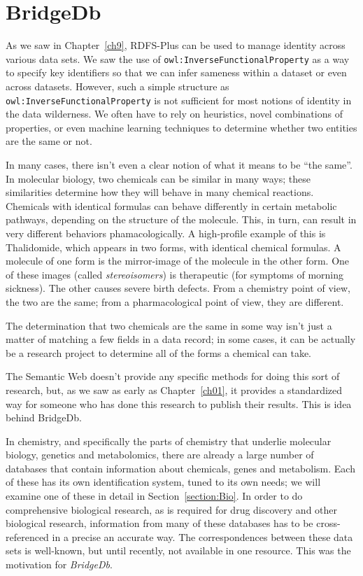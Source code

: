 \section{BridgeDb}

As we saw in Chapter~\ref{ch9}, RDFS-Plus can be used to manage identity 
across various data sets.  We saw the use of \texttt{owl:InverseFunctionalProperty}
as a way to specify key identifiers so that we can infer sameness within a 
dataset or even across datasets.  However, such a simple structure as 
\texttt{owl:InverseFunctionalProperty} is not sufficient for most notions of identity
in the data wilderness.  We often have to rely on heuristics, novel combinations
of properties, or even machine learning techniques to determine whether two 
entities are the same or not. 


In many cases, there isn't even a clear notion of what it means to be ``the same''.  
In molecular biology, two chemicals can be similar in many ways; these similarities 
determine how they will behave in many chemical reactions.  Chemicals with identical
formulas can behave differently in certain metabolic pathways, depending on the 
structure of the molecule.  This, in turn, can result in very different behaviors
phamacologically.  A high-profile example of this is Thalidomide, which appears in 
two forms, with identical chemical formulas.  A molecule of one form is the mirror-image
of the molecule in the other form.  One of these images (called \emph{stereoisomers}) 
is therapeutic (for symptoms of morning sickness).  The other causes severe birth
defects.  From a chemistry point of view, the two are the same; from a pharmacological 
point of view, they are different.  

The determination that two chemicals are the same in some way isn't just a matter of 
matching a few fields in a data record; in some cases, it can be actually be a research
project to determine all of the forms a chemical can take.  

The Semantic Web doesn't provide any specific methods for doing this sort of research, but,
as we saw as early as Chapter~\ref{ch01}, it provides a standardized way for someone 
who has done this research to publish their results.  This is idea behind BridgeDb.

In chemistry, and specifically the parts of chemistry that underlie molecular biology, genetics
and metabolomics, there are already a large number of databases that contain information 
about chemicals, genes and metabolism.  Each of these has its own identification system,
tuned to its own needs; we will examine one of these in detail in Section~\ref{section:Bio}.  
In order to do comprehensive biological research, as is required for drug discovery and 
other biological research, information from many of these databases has to be cross-referenced
in a precise an accurate way.  The correspondences between these data sets is well-known, 
but until recently, not available in one resource.  This was the motivation for \emph{BridgeDb}. 

